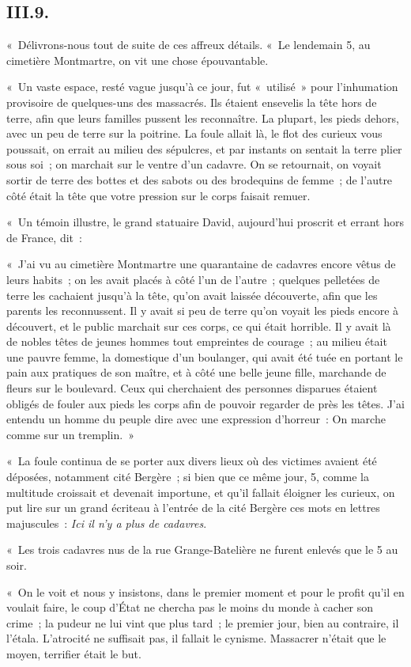 \documentclass[french,twoside]{book} %
\newenvironment{quoteblock}%
  {\begin{quoting}}
  {\end{quoting}}
\newenvironment{quotebar}{%
    \def\FrameCommand{{\color{rubric!10!}\vrule width 0.5em} \hspace{0.9em}}%
    \def\OuterFrameSep{\itemsep} %
    \MakeFramed {\advance\hsize-\width \FrameRestore}
  }%
  {%
    \endMakeFramed
  }
\renewenvironment{quoteblock}%
  {%
    \savenotes
    \setstretch{0.9}
    \normalfont
    \begin{quotebar}
  }
  {%
    \end{quotebar}
    \spewnotes
  }
\begin{document}
\subsection[{III.9.}]{III.9.}
\noindent « Délivrons-nous tout de suite de ces affreux détails. « Le lendemain 5, au cimetière Montmartre, on vit une chose épouvantable.\par
« Un vaste espace, resté vague jusqu’à ce jour, fut « utilisé » pour l’inhumation provisoire de quelques-uns des massacrés. Ils étaient ensevelis la tête hors de terre, afin que leurs familles pussent les reconnaître. La plupart, les pieds dehors, avec un peu de terre sur la poitrine. La foule allait là, le flot des curieux vous poussait, on errait au milieu des sépulcres, et par instants on sentait la terre plier sous soi ; on marchait sur le ventre d’un cadavre. On se retournait, on voyait sortir de terre des bottes et des sabots ou des brodequins de femme ; de l’autre côté était la tête que votre pression sur le corps faisait remuer.\par
« Un témoin illustre, le grand statuaire David, aujourd’hui proscrit et errant hors de France, dit :\par

\begin{quoteblock}
 \noindent « J’ai vu au cimetière Montmartre une quarantaine de cadavres encore vêtus de leurs habits ; on les avait placés à côté l’un de l’autre ; quelques pelletées de terre les cachaient jusqu’à la tête, qu’on avait laissée découverte, afin que les parents les reconnussent. Il y avait si peu de terre qu’on voyait les pieds encore à découvert, et le public marchait sur ces corps, ce qui était horrible. Il y avait là de nobles têtes de jeunes hommes tout empreintes de courage ; au milieu était une pauvre femme, la domestique d’un boulanger, qui avait été tuée en portant le pain aux pratiques de son maître, et à côté une belle jeune fille, marchande de fleurs sur le boulevard. Ceux qui cherchaient des personnes disparues étaient obligés de fouler aux pieds les corps afin de pouvoir regarder de près les têtes. J’ai entendu un homme du peuple dire avec une expression d’horreur : On marche comme sur un tremplin. »
 \end{quoteblock}

\noindent « La foule continua de se porter aux divers lieux où des victimes avaient été déposées, notamment cité Bergère ; si bien que ce même jour, 5, comme la multitude croissait et devenait importune, et qu’il fallait éloigner les curieux, on put lire sur un grand écriteau à l’entrée de la cité Bergère ces mots en lettres majuscules : \emph{Ici il n’y a plus de cadavres}.\par
« Les trois cadavres nus de la rue Grange-Batelière ne furent enlevés que le 5 au soir.\par
« On le voit et nous y insistons, dans le premier moment et pour le profit qu’il en voulait faire, le coup d’État ne chercha pas le moins du monde à cacher son crime ; la pudeur ne lui vint que plus tard ; le premier jour, bien au contraire, il l’étala. L’atrocité ne suffisait pas, il fallait le cynisme. Massacrer n’était que le moyen, terrifier était le but.
\end{document}
